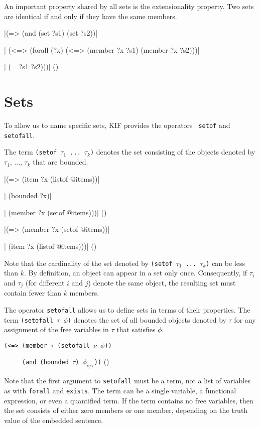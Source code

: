 An important property shared by all sets is the extensionality property. 
Two sets are identical if  and only if they have the same members.

\medskip
\verbatim|(=> (and (set ?s1) (set ?s2))|\par
\verbatim|    (<=> (forall (?x) (<=> (member ?x ?s1) (member ?x ?s2)))|\par
\verbatim|         (= ?s1 ?s2)))|
\hfill(\equation)\par 
\medskip

\section{Sets}

To allow us to name specific sets, KIF provides the operators {\tt
setof} and {\tt setofall}.

The term {\tt (setof $\tau_1$ ... $\tau_k$)} denotes the set consisting of
the objects denoted by $\tau_1$, ..., $\tau_k$ that are bounded.

\medskip
\verbatim|(=> (item ?x (listof @items))|\par
\verbatim|    (bounded ?x)|\par
\verbatim|    (member ?x (setof @items)))|
\hfill(\equation)\par
\medskip

\medskip
\verbatim|(=> (member ?x (setof @items))|\par
\verbatim|    (item ?x (listof @items)))|
\hfill(\equation)\par
\medskip

Note that the cardinality of the set denoted by {\tt (setof $\tau_1$ ...
$\tau_k$)} can be less than $k$.  By definition, an object can appear in
a set only once.  Consequently, if $\tau_i$ and $\tau_j$ (for different
$i$ and $j$) denote the same object, the resulting set must contain
fewer than $k$ members.

The operator {\tt setofall} allows us  to define sets in terms of their
properties.  The term {\tt (setofall $\tau$ $\phi$)} denotes the set of
all bounded objects denoted by $\tau$ for any assignment of the free
variables in $\tau$ that satisfies $\phi$.

\medskip
{\tt (<=> (member $\tau$ (setofall $\nu$ $\phi$))}\par
{\tt \ \ \ \ \ (and (bounded $\tau$) $\phi_{\nu/\tau}$))}
\hfill(\equation)\par
\medskip

Note that the first argument to {\tt setofall} must be a term,
not a list of variables as with {\tt forall} and {\tt exists}.  The
term can be a single variable, a functional expression, or even a
quantified term.  If the term contains no free variables, then the
set consists of either zero members or one member, depending on the
truth value of the embedded sentence.

